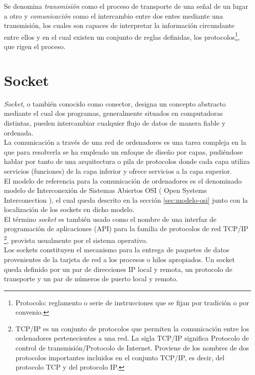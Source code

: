 Se denomina \emph{transmisión} como el proceso de transporte de una señal de un lugar a otro y \emph{comunicación} como el intercambio entre dos entes mediante una transmisión, los cuales son capaces de
interpretar la información circundante entre ellos y en el cual existen un conjunto de reglas definidas, los protocolos\footnote{Protocolo: reglamento o serie de instrucciones que se fijan por tradición o por convenio. },
que rigen el proceso.

\section{Socket}
\label{sec:def-socket}

\emph{Socket}, o también conocido como conector, designa un concepto abstracto mediante el cual dos programas, generalmente situados en computadoras distintas, pueden intercambiar cualquier flujo de datos
de manera fiable y ordenada.\\

La comunicación a través de una red de ordenadores es una tarea compleja en la que para resolverla se ha empleado un enfoque de diseño por capas, pudiéndose hablar por tanto de una arquitectura 
o pila de protocolos donde cada capa utiliza servicios (funciones) de la capa inferior y ofrece servicios a la capa superior. \\

El modelo de referencia para la comunicación de ordenadores es el denominado modelo de Interconexión de Sistemas Abiertos OSI ( Open Systems Interconection ), el cual queda descrito
en la sección \ref{sec:modelo-osi} junto con la localización de los sockets en dicho modelo.\\

El término \emph{socket} es también usado como el nombre de una interfaz de programación de aplicaciones (API) para la familia de protocolos de red TCP/IP \footnote{ TCP/IP es un conjunto de protocolos que
permiten la comunicación entre los ordenadores pertenecientes a una red. La sigla TCP/IP significa Protocolo de control de transmisión/Protocolo de Internet. Proviene de los nombres de dos protocolos 
importantes incluidos en el conjunto TCP/IP, es decir, del protocolo TCP y del protocolo IP. }, provista usualmente por el sistema operativo.\\

Los sockets constituyen el mecanismo para la entrega de paquetes de datos provenientes de la tarjeta de red a los procesos o hilos apropiados. Un socket queda definido por un par de direcciones IP local
y remota, un protocolo de transporte y un par de números de puerto local y remoto.\\


